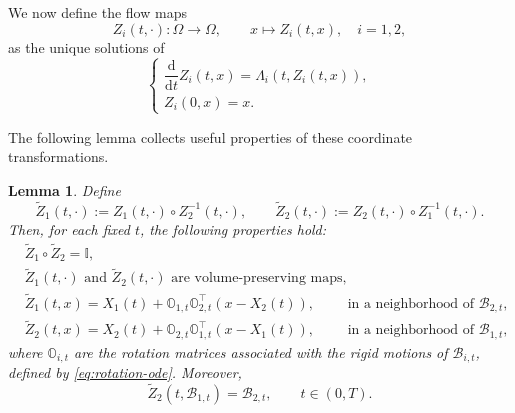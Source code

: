 \documentclass[11pt,twoside,reqno]{amsart}
\numberwithin{equation}{section}
\numberwithin{figure}{section}
\newtheorem{lemma}{Lemma}[section]
\begin{document}
We now define the flow maps
\[
Z_i(t,\cdot):\Omega\to\Omega,\qquad x\mapsto Z_i(t,x),\quad i=1,2,
\]
as the unique solutions of
\begin{equation}
\begin{cases}
\dfrac{\mathrm{d}}{\mathrm{d}t}Z_i(t,x)=\Lambda_i(t,Z_i(t,x)),\\[6pt]
Z_i(0,x)=x.
\end{cases}
\end{equation}

The following lemma collects useful properties of these coordinate transformations.

\begin{lemma}\label{lem:PropertiesZi}
Define
\[
\tilde{Z}_1(t,\cdot):=Z_1(t,\cdot)\circ Z_2^{-1}(t,\cdot),\qquad
\tilde{Z}_2(t,\cdot):=Z_2(t,\cdot)\circ Z_1^{-1}(t,\cdot).
\]
Then, for each fixed $t$, the following properties hold:
\begin{equation}
\begin{aligned}
&\tilde{Z}_1\circ\tilde{Z}_2=\mathbb{I},\\
&\tilde{Z}_1(t,\cdot) \text{~and~} \tilde{Z}_2(t,\cdot) \text{~are volume-preserving maps,}\\
&\tilde{Z}_1(t,x)=X_1(t)+\mathbb{O}_{1,t}\mathbb{O}_{2,t}^\top(x-X_2(t)),\qquad \text{~in a neighborhood of~}\mathcal{B}_{2,t},\\
&\tilde{Z}_2(t,x)=X_2(t)+\mathbb{O}_{2,t}\mathbb{O}_{1,t}^\top(x-X_1(t)),\qquad \text{~in a neighborhood of~}\mathcal{B}_{1,t},
\end{aligned}
\end{equation}
where $\mathbb{O}_{i,t}$ are the rotation matrices associated with the rigid motions of $\mathcal{B}_{i,t}$, defined by \eqref{eq:rotation-ode}.  
Moreover,
\begin{equation}
\tilde{Z}_2(t,\mathcal{B}_{1,t})=\mathcal{B}_{2,t},\qquad t\in(0,T).
\end{equation}
\end{lemma}
\end{document}
